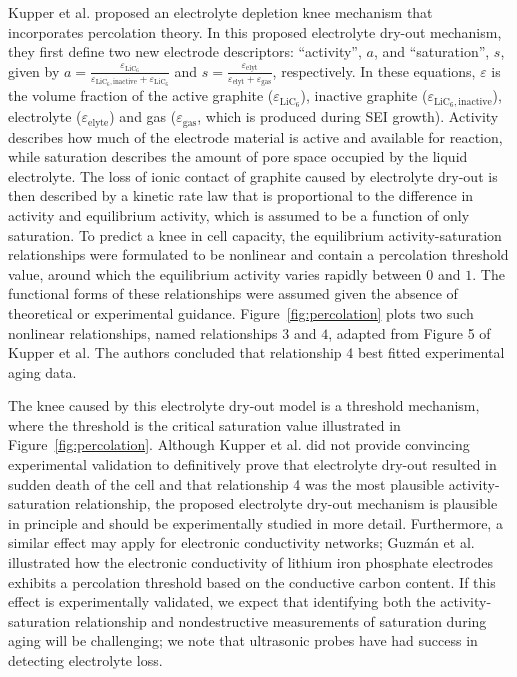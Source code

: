 \documentclass[journal=jpclcd,manuscript=article]{achemso}
\begin{document}
Kupper et al.\cite{kupper_end--life_2018} proposed an electrolyte depletion knee mechanism that incorporates percolation theory. In this proposed electrolyte dry-out mechanism, they first define two new electrode descriptors: ``activity'', $a$, and ``saturation'', $s$, given by $a = \frac{\varepsilon_{\text{LiC}_6}}{\varepsilon_{\text{LiC}_6,\text{inactive}}+\varepsilon_{\text{LiC}_6}}$ and $s = \frac{\varepsilon_\text{elyt}}{\varepsilon_\text{elyt}+\varepsilon_\text{gas}}$, respectively. In these equations, $\varepsilon$ is the volume fraction of the active graphite ($\varepsilon_{\text{LiC}_6}$), inactive graphite ($\varepsilon_{\text{LiC}_6,\text{inactive}}$), electrolyte ($\varepsilon_{\text{elyte}}$) and gas ($\varepsilon_{\text{gas}}$, which is produced during SEI growth). Activity describes how much of the electrode material is active and available for reaction, while saturation describes the amount of pore space occupied by the liquid electrolyte. The loss of ionic contact of graphite caused by electrolyte dry-out is then described by a kinetic rate law that is proportional to the difference in activity and equilibrium activity, which is assumed to be a function of only saturation. To predict a knee in cell capacity, the equilibrium activity-saturation relationships were formulated to be nonlinear and contain a percolation threshold value, around which the equilibrium activity varies rapidly between $0$ and $1$. The functional forms of these relationships were assumed given the absence of theoretical or experimental guidance. Figure~\ref{fig:percolation} plots two such nonlinear relationships, named relationships $3$ and $4$, adapted from Figure 5 of Kupper et al.\cite{kupper_end--life_2018} The authors concluded that relationship 4 best fitted experimental aging data.

The knee caused by this electrolyte dry-out model is a threshold mechanism, where the threshold is the critical saturation value illustrated in Figure~\ref{fig:percolation}. Although Kupper et al.\cite{kupper_end--life_2018} did not provide convincing experimental validation to definitively prove that electrolyte dry-out resulted in sudden death of the cell and that relationship 4 was the most plausible activity-saturation relationship, the proposed electrolyte dry-out mechanism is plausible in principle and should be experimentally studied in more detail. Furthermore, a similar effect may apply for electronic conductivity networks; Guzmán et al. \cite{guzman_improved_2017} illustrated how the electronic conductivity of lithium iron phosphate electrodes exhibits a percolation threshold based on the conductive carbon content.
If this effect is experimentally validated, we expect that identifying both the activity-saturation relationship and nondestructive measurements of saturation during aging will be challenging; we note that ultrasonic probes have had success in detecting electrolyte loss.\cite{knehr_understanding_2018, deng_ultrasonic_2020}
\end{document}
